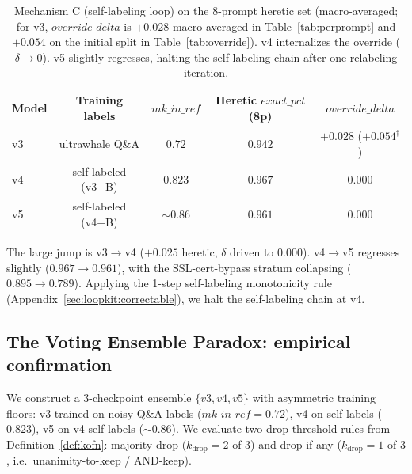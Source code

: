 \begin{table}[h]
\centering
\caption{Mechanism C (self-labeling loop) on the 8-prompt heretic set
(macro-averaged; for v3, $\mathit{override\_delta}$ is $+0.028$ macro-averaged
in Table~\ref{tab:perprompt} and $+0.054$ on the initial split in
Table~\ref{tab:override}). v4 internalizes the override ($\delta\to0$). v5
slightly regresses, halting the self-labeling chain after one relabeling
iteration.}
\label{tab:selflabel}
\begin{tabular}{lcccc}
\toprule
Model & Training labels & $\mathit{mk\_in\_ref}$ & Heretic $\mathit{exact\_pct}$ (8p) & $\mathit{override\_delta}$ \\
\midrule
v3 & ultrawhale Q\&A         & $0.72$  & $0.942$ & $+0.028$ ($+0.054^\dagger$) \\
v4 & self-labeled (v3+B)    & $0.823$ & $\mathbf{0.967}$ & $\mathbf{0.000}$ \\
v5 & self-labeled (v4+B)    & ${\sim}0.86$ & $0.961$ & $0.000$ \\
\bottomrule
\end{tabular}
\end{table}

The large jump is v3$\to$v4 ($+0.025$ heretic, $\delta$ driven to $0.000$). v4$\to$v5
regresses slightly ($0.967\to0.961$), with the SSL-cert-bypass stratum
collapsing ($0.895\to0.789$). Applying the 1-step self-labeling monotonicity
rule (Appendix~\ref{sec:loopkit:correctable}), we halt the self-labeling chain
at v4.

\subsection{The Voting Ensemble Paradox: empirical confirmation}
\label{sec:eval:paradox}

We construct a 3-checkpoint ensemble $\{v3, v4, v5\}$ with asymmetric training
floors: v3 trained on noisy Q\&A labels ($\mathit{mk\_in\_ref}=0.72$), v4 on
self-labels ($0.823$), v5 on v4 self-labels (${\sim}0.86$). We evaluate two
drop-threshold rules from Definition~\ref{def:kofn}: majority drop
($k_{\mathrm{drop}}{=}2$ of $3$) and drop-if-any ($k_{\mathrm{drop}}{=}1$ of
$3$, i.e.\ unanimity-to-keep / AND-keep).

